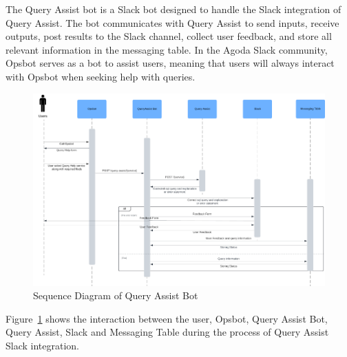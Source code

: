     The Query Assist bot is a Slack bot designed to handle the Slack integration of Query Assist. The bot communicates with Query Assist to send inputs, receive outputs, post results to the Slack channel, collect user feedback, and store all relevant information in the messaging table. In the Agoda Slack community, Opsbot serves as a bot to assist users, meaning that users will always interact with Opsbot when seeking help with queries.
    \begin{figure}[H]
        \centering
        \includegraphics[width=15cm]{chapters/3/figures/sequence_diagram.png}
        \caption[Sequence Diagram of Query Assist Bot]{Sequence Diagram of Query Assist Bot}
        \label{fig:sequence_diagram}
    \end{figure}
    Figure~\ref{fig:sequence_diagram} shows the interaction between the user, Opsbot, Query Assist Bot, Query Assist, Slack and Messaging Table during the process of Query Assist Slack integration.


